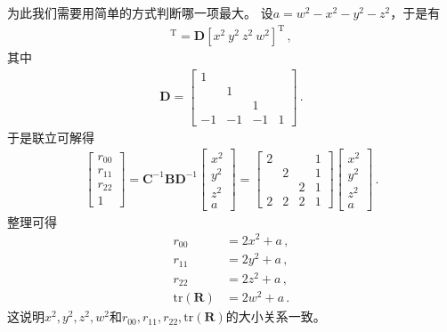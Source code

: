 为此我们需要用简单的方式判断哪一项最大。
设$a=w^2-x^2-y^2-z^2$，于是有
\begin{align}
    [x^2\ y^2\ z^2\ a]^\mathrm{T}=\bm D[x^2\ y^2\ z^2\ w^2]^\mathrm{T}\, ,
\end{align}
其中
\begin{align}
    \bm D=\left[\begin{array}{rrrr}
            1  &    &    &   \\
               & 1  &    &   \\
               &    & 1  &   \\
            -1 & -1 & -1 & 1
        \end{array}\right]\, .
\end{align}
于是联立可解得
\begin{align}
    \left[\begin{array}{c}
            r_{00} \\r_{11}\\r_{22}\\1
        \end{array}\right]=\bm C^{-1}\bm B\bm D^{-1}\left[\begin{array}{c}
            x^2 \\ y^2\\ z^2\\ a
        \end{array}\right]=\left[\begin{array}{cccc}
            2 &   &   & 1 \\
              & 2 &   & 1 \\
              &   & 2 & 1 \\
            2 & 2 & 2 & 1
        \end{array}\right]\left[\begin{array}{c}
            x^2 \\ y^2\\ z^2\\ a
        \end{array}\right]\, .
\end{align}
整理可得
\begin{align}
    r_{00}             & =2x^2+a\, , \\
    r_{11}             & =2y^2+a\, , \\
    r_{22}             & =2z^2+a\, , \\
    \mathrm{tr}(\bm R) & =2w^2+a\, .
\end{align}
这说明$x^2,y^2,z^2,w^2$和$r_{00},r_{11},r_{22},\mathrm{tr}(\bm R)$的大小关系一致。

